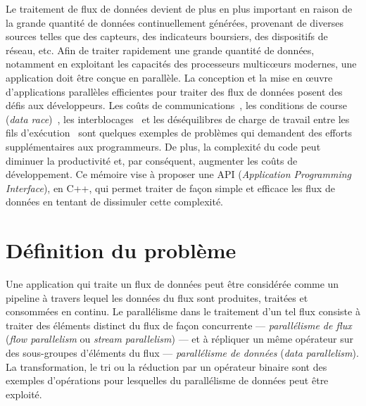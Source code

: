 \begin{introduction}

Le traitement de flux de donn\'ees devient de plus en plus important en raison de la grande quantit\'e de donn\'ees continuellement g\'en\'er\'ees, provenant de diverses sources telles que des capteurs, des indicateurs boursiers, des dispositifs de r\'eseau, etc. Afin de traiter rapidement une grande quantit\'e de donn\'ees, notamment en exploitant les capacit\'es des processeurs multicœurs modernes, une application doit \^etre con\c cue en parall\`ele. La conception et la mise en œuvre d'applications parall\`eles efficientes pour traiter des flux de donn\'ees posent des d\'efis aux d\'eveloppeurs. Les co\^uts de communications~\citep{amarasinghe2011ascr}, les conditions de course (\emph{data race})~\citep{wu2015detecting}, les interblocages~\citep{haque2006concurrent} et les d\'es\'equilibres de charge de travail entre les fils d'ex\'ecution~\citep{amarasinghe2011ascr} sont quelques exemples de probl\`emes qui demandent des efforts suppl\'ementaires aux programmeurs. De plus, la complexit\'e du code peut diminuer la productivit\'e et, par cons\'equent, augmenter les co\^uts de d\'eveloppement. Ce m\'emoire vise \`a proposer une API (\emph{Application Programming Interface}), en C++, qui permet traiter de fa\c con simple et efficace les flux de donn\'ees en tentant de dissimuler cette complexit\'e.

\section*{D\'efinition du probl\`eme}

Une application qui traite un flux de données peut \^etre consid\'er\'ee comme un pipeline \`a travers lequel les donn\'ees du flux sont produites, trait\'ees et consomm\'ees en continu. Le parall\'elisme dans le traitement d'un tel flux consiste \`a traiter des \'el\'ements distinct du flux de fa\c{c}on concurrente --- \emph{parall\'elisme de flux} (\emph{flow parallelism} ou \emph{stream parallelism}) --- et \`a r\'epliquer un m\^eme op\'erateur sur des sous-groupes d'\'el\'ements du flux --- \emph{parall\'elisme de donn\'ees} (\emph{data parallelism}). La transformation, le tri ou la r\'eduction par un op\'erateur binaire sont des exemples d'op\'erations pour lesquelles du parall\'elisme de donn\'ees peut \^etre exploit\'e. 





\end{introduction}
